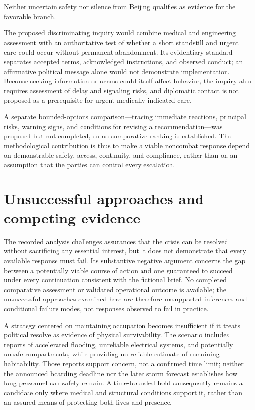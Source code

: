 \documentclass[11pt]{article}
\begin{document}
Neither uncertain safety nor silence from Beijing qualifies as evidence for the favorable branch.

The proposed discriminating inquiry would combine medical and engineering assessment with an authoritative test of whether a short standstill and urgent care could occur without permanent abandonment. Its evidentiary standard separates accepted terms, acknowledged instructions, and observed conduct; an affirmative political message alone would not demonstrate implementation. Because seeking information or access could itself affect behavior, the inquiry also requires assessment of delay and signaling risks, and diplomatic contact is not proposed as a prerequisite for urgent medically indicated care.

A separate bounded-options comparison—tracing immediate reactions, principal risks, warning signs, and conditions for revising a recommendation—was proposed but not completed, so no comparative ranking is established. The methodological contribution is thus to make a viable noncombat response depend on demonstrable safety, access, continuity, and compliance, rather than on an assumption that the parties can control every escalation.

\section{Unsuccessful approaches and competing evidence}
The recorded analysis challenges assurances that the crisis can be resolved without sacrificing any essential interest, but it does not demonstrate that every available response must fail. Its substantive negative argument concerns the gap between a potentially viable course of action and one guaranteed to succeed under every continuation consistent with the fictional brief. No completed comparative assessment or validated operational outcome is available; the unsuccessful approaches examined here are therefore unsupported inferences and conditional failure modes, not responses observed to fail in practice.

A strategy centered on maintaining occupation becomes insufficient if it treats political resolve as evidence of physical survivability. The scenario includes reports of accelerated flooding, unreliable electrical systems, and potentially unsafe compartments, while providing no reliable estimate of remaining habitability. Those reports support concern, not a confirmed time limit; neither the announced boarding deadline nor the later storm forecast establishes how long personnel can safely remain. A time-bounded hold consequently remains a candidate only where medical and structural conditions support it, rather than an assured means of protecting both lives and presence.
\end{document}
